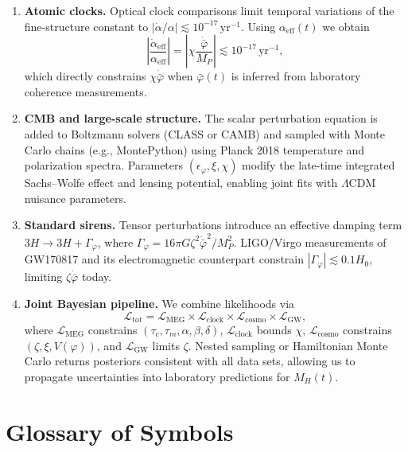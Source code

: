\documentclass[12pt,a4paper]{article}
\theoremstyle{definition}
\begin{document}
\begin{enumerate}
    \item \textbf{Atomic clocks.} Optical clock comparisons limit temporal variations of the fine-structure constant to $|\dot{\alpha}/\alpha| \lesssim 10^{-17}\,\text{yr}^{-1}$\cite{Rosenband2008}. Using $\alpha_{\text{eff}}(t)$ we obtain
    \begin{equation}
    \left|\frac{\dot{\alpha}_{\text{eff}}}{\alpha_{\text{eff}}}\right| = \left|\chi \frac{\dot{\bar{\varphi}}}{M_P}\right| \lesssim 10^{-17}\,\text{yr}^{-1},
    \end{equation}
    which directly constrains $\chi \dot{\bar{\varphi}}$ when $\bar{\varphi}(t)$ is inferred from laboratory coherence measurements.
    \item \textbf{CMB and large-scale structure.} The scalar perturbation equation is added to Boltzmann solvers (CLASS\cite{Blas2011} or CAMB\cite{Lewis2000}) and sampled with Monte Carlo chains (e.g., MontePython\cite{Audren2013}) using Planck 2018 temperature and polarization spectra\cite{Planck2018}. Parameters $(\epsilon_\varphi,\xi,\chi)$ modify the late-time integrated Sachs--Wolfe effect and lensing potential, enabling joint fits with $\Lambda$CDM nuisance parameters.
    \item \textbf{Standard sirens.} Tensor perturbations introduce an effective damping term $3H \rightarrow 3H + \Gamma_\varphi$, where $\Gamma_\varphi = 16\pi G \zeta^2 \dot{\bar{\varphi}}^2/M_P^2$. LIGO/Virgo measurements of GW170817 and its electromagnetic counterpart constrain $|\Gamma_\varphi| \lesssim 0.1 H_0$\cite{Abbott2019}, limiting $\zeta \dot{\bar{\varphi}}$ today.
    \item \textbf{Joint Bayesian pipeline.} We combine likelihoods via
    \begin{equation}
    \mathcal{L}_{\text{tot}} = \mathcal{L}_{\text{MEG}} \times \mathcal{L}_{\text{clock}} \times \mathcal{L}_{\text{cosmo}} \times \mathcal{L}_{\text{GW}},
    \end{equation}
    where $\mathcal{L}_{\text{MEG}}$ constrains $(\tau_c,\tau_m,\alpha,\beta,\delta)$, $\mathcal{L}_{\text{clock}}$ bounds $\chi$, $\mathcal{L}_{\text{cosmo}}$ constrains $(\zeta,\xi,V(\varphi))$, and $\mathcal{L}_{\text{GW}}$ limits $\zeta$. Nested sampling or Hamiltonian Monte Carlo returns posteriors consistent with all data sets, allowing us to propagate uncertainties into laboratory predictions for $M_H(t)$.
\end{enumerate}

\section{Glossary of Symbols}
\end{document}
